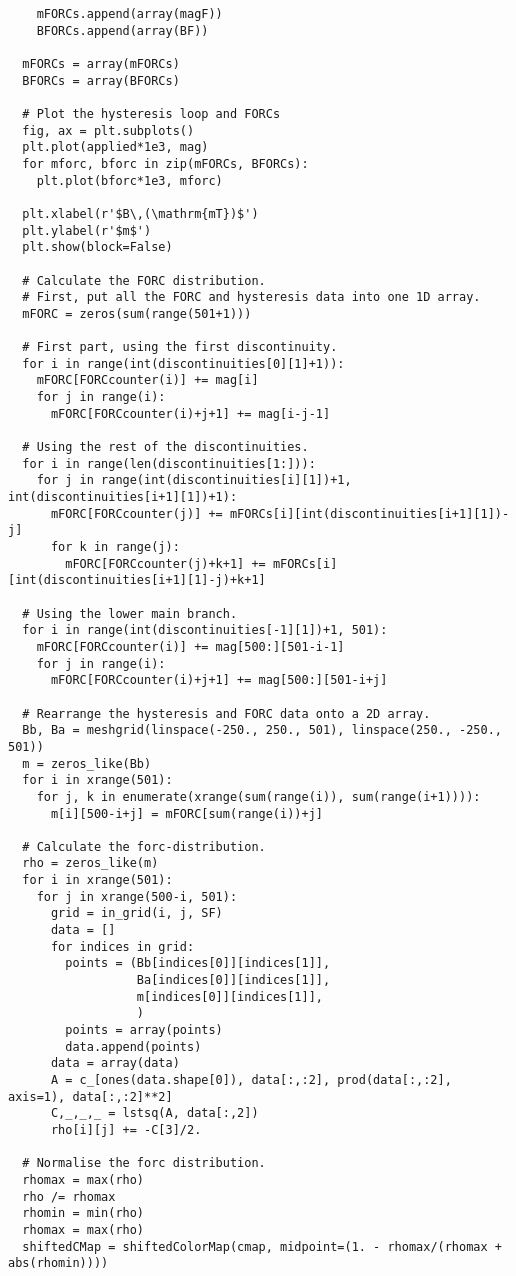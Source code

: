 \begin{lstlisting}
    mFORCs.append(array(magF))
    BFORCs.append(array(BF))

  mFORCs = array(mFORCs)
  BFORCs = array(BFORCs)

  # Plot the hysteresis loop and FORCs
  fig, ax = plt.subplots()
  plt.plot(applied*1e3, mag)
  for mforc, bforc in zip(mFORCs, BFORCs):
    plt.plot(bforc*1e3, mforc)

  plt.xlabel(r'$B\,(\mathrm{mT})$')
  plt.ylabel(r'$m$')
  plt.show(block=False)

  # Calculate the FORC distribution.
  # First, put all the FORC and hysteresis data into one 1D array.
  mFORC = zeros(sum(range(501+1)))

  # First part, using the first discontinuity.
  for i in range(int(discontinuities[0][1]+1)):
    mFORC[FORCcounter(i)] += mag[i]
    for j in range(i):
      mFORC[FORCcounter(i)+j+1] += mag[i-j-1]

  # Using the rest of the discontinuities.
  for i in range(len(discontinuities[1:])):
    for j in range(int(discontinuities[i][1])+1, int(discontinuities[i+1][1])+1):
      mFORC[FORCcounter(j)] += mFORCs[i][int(discontinuities[i+1][1])-j]
      for k in range(j):
        mFORC[FORCcounter(j)+k+1] += mFORCs[i][int(discontinuities[i+1][1]-j)+k+1]

  # Using the lower main branch.
  for i in range(int(discontinuities[-1][1])+1, 501):
    mFORC[FORCcounter(i)] += mag[500:][501-i-1]
    for j in range(i):
      mFORC[FORCcounter(i)+j+1] += mag[500:][501-i+j]

  # Rearrange the hysteresis and FORC data onto a 2D array.
  Bb, Ba = meshgrid(linspace(-250., 250., 501), linspace(250., -250., 501))
  m = zeros_like(Bb)
  for i in xrange(501):
    for j, k in enumerate(xrange(sum(range(i)), sum(range(i+1)))):
      m[i][500-i+j] = mFORC[sum(range(i))+j]

  # Calculate the forc-distribution.
  rho = zeros_like(m)
  for i in xrange(501):
    for j in xrange(500-i, 501):
      grid = in_grid(i, j, SF)
      data = []
      for indices in grid:
        points = (Bb[indices[0]][indices[1]],
                  Ba[indices[0]][indices[1]],
                  m[indices[0]][indices[1]],
                  )
        points = array(points)
        data.append(points)
      data = array(data)
      A = c_[ones(data.shape[0]), data[:,:2], prod(data[:,:2], axis=1), data[:,:2]**2]
      C,_,_,_ = lstsq(A, data[:,2])
      rho[i][j] += -C[3]/2.

  # Normalise the forc distribution.
  rhomax = max(rho)
  rho /= rhomax
  rhomin = min(rho)
  rhomax = max(rho)
  shiftedCMap = shiftedColorMap(cmap, midpoint=(1. - rhomax/(rhomax + abs(rhomin))))


\end{lstlisting}
